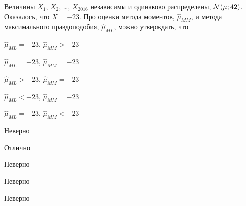 
\begin{question}
Величины \(X_1\), \(X_2\), \ldots, \(X_{2016}\) независимы и одинаково
распределены, \(\mathcal{N}(\mu ; 42)\). Оказалось, что \(\bar X = -23\). Про
оценки метода моментов, \(\hat \mu_{MM}\), и метода максимального
правдоподобия, \(\hat \mu_{ML}\), можно утверждать, что
\begin{answerlist}
  \item \(\hat \mu_{ML} = -23\), \(\hat\mu_{MM} > -23\)
  \item \(\hat \mu_{ML} = -23\), \(\hat\mu_{MM} = -23\)
  \item \(\hat \mu_{ML} > -23\), \(\hat\mu_{MM} = -23\)
  \item \(\hat \mu_{ML} < -23\), \(\hat\mu_{MM} = -23\)
  \item \(\hat \mu_{ML} = -23\), \(\hat\mu_{MM} < -23\)
\end{answerlist}
\end{question}

\begin{solution}
\begin{answerlist}
  \item Неверно
  \item Отлично
  \item Неверно
  \item Неверно
  \item Неверно
\end{answerlist}
\end{solution}

